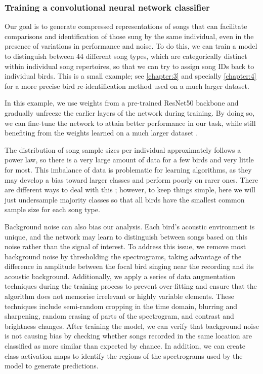 
\subsubsection{Training a convolutional neural network classifier}
Our goal is to generate compressed representations of songs that can facilitate comparisons and identification of those sung by the same individual, even in the presence of variations in performance and noise. To do this, we can train a model to distinguish between 44 different song types, which are categorically distinct within individual song repertoires, so that we can try to assign song IDs back to individual birds. This is a small example; see \autoref{chapter:3} and specially \autoref{chapter:4} for a more precise bird re-identification method used on a much larger dataset.

In this example, we use weights from a pre-trained ResNet50 backbone \parencite{he2015} and gradually unfreeze the earlier layers of the network during training. By doing so, we can fine-tune the network to attain better performance in our task, while still benefiting from the weights learned on a much larger dataset \parencite{zhuang2021}. 

The distribution of song sample sizes per individual approximately follows a
power law, so there is a very large amount of data for a few birds and very
little for most. This imbalance of data is problematic for learning algorithms, as they may develop a bias toward larger classes and perform poorly on rarer ones. There are different ways to deal with this \parencite[see, e.g.,][]{krawczyk2016, thabtah2020}; however, to keep things simple, here we will just undersample majority classes so that all birds have the smallest common sample size for each song type.

Background noise can also bias our analysis. Each bird's acoustic environment is unique, and the network may learn to distinguish between songs based on this noise rather than the signal of interest. To address this issue, we remove most background noise by thresholding the spectrograms, taking advantage of the difference in amplitude between the focal bird singing near the recording and its acoustic background. Additionally, we apply a series of data augmentation techniques during the training process to prevent over-fitting and ensure that the algorithm does not memorise irrelevant or highly variable elements. These techniques include semi-random cropping in the time domain, blurring and sharpening, random erasing of parts of the spectrogram, and contrast and brightness changes. After training the model, we can verify that background noise is not causing bias by checking whether songs recorded in the same location are classified as more similar than expected by chance. In addition, we can create class activation maps to identify the regions of the spectrograms used by the model to generate predictions.

